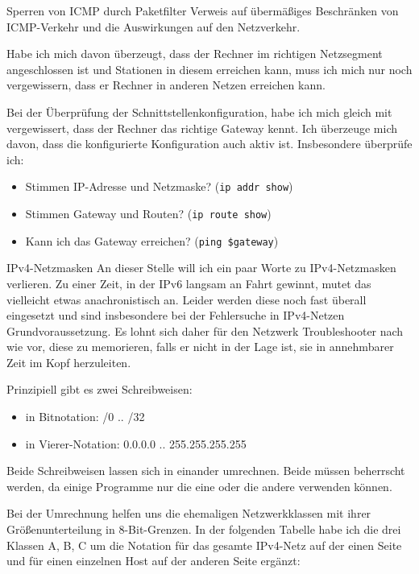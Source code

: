 \begin{normaltext}
\begin{Exkursbox}{Sperren von ICMP durch Paketfilter}
  Verweis auf übermäßiges Beschränken von ICMP-Verkehr und die Auswirkungen
  auf den Netzverkehr.
\end{Exkursbox}

Habe ich mich davon überzeugt, dass der Rechner im richtigen Netzsegment
angeschlossen ist und Stationen in diesem erreichen kann, muss ich mich nur
noch vergewissern, dass er Rechner in anderen Netzen erreichen kann.

Bei der Überprüfung der Schnittstellenkonfiguration, habe ich mich gleich mit
vergewissert, dass der Rechner das richtige Gateway kennt. Ich überzeuge mich
davon, dass die konfigurierte Konfiguration auch aktiv ist. Insbesondere
überprüfe ich:

\begin{itemize}
  \item Stimmen IP-Adresse und Netzmaske? (\verb?ip addr show?)
  \item Stimmen Gateway und Routen? (\verb?ip route show?)
  \item Kann ich das Gateway erreichen? (\verb?ping $gateway?)
\end{itemize}

\begin{Exkursbox}{IPv4-Netzmasken}
  An dieser Stelle will ich ein paar Worte zu IPv4-Netzmasken verlieren. Zu
  einer Zeit, in der IPv6 langsam an Fahrt gewinnt, mutet das vielleicht etwas
  anachronistisch an. Leider werden diese noch fast überall eingesetzt und
  sind insbesondere bei der Fehlersuche in IPv4-Netzen Grundvoraussetzung. Es
  lohnt sich daher für den Netzwerk Troubleshooter nach wie vor, diese zu
  memorieren, falls er nicht in der Lage ist, sie in annehmbarer Zeit im Kopf
  herzuleiten.

  Prinzipiell gibt es zwei Schreibweisen:
  \begin{itemize}
    \item in Bitnotation: /0 .. /32
    \item in Vierer-Notation: 0.0.0.0 .. 255.255.255.255
  \end{itemize}
  Beide Schreibweisen lassen sich in einander umrechnen. Beide müssen
  beherrscht werden, da einige Programme nur die eine oder die andere
  verwenden können.

  Bei der Umrechnung helfen uns die ehemaligen Netzwerkklassen mit ihrer
  Größenunterteilung in 8-Bit-Grenzen.
  In der folgenden Tabelle habe ich die drei Klassen A, B, C um die Notation
  für das gesamte IPv4-Netz auf der einen Seite und für einen einzelnen Host
  auf der anderen Seite ergänzt:


\end{Exkursbox}
\end{normaltext}
